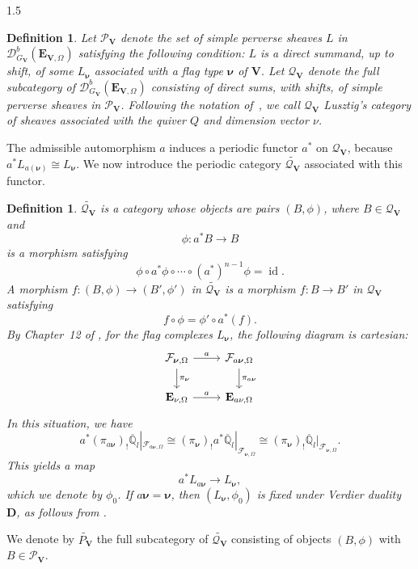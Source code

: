 \documentclass[10pt]{amsart}
\newtheorem{definition}[theorem]{Definition}
\def\bfV{{\mathbf V}}
\def\bfV{\mathbf{V}}
\newcommand\mP{{\mathcal{P}}}
\newcommand\mq{{\mathcal{Q}}}
\begin{document}
\begin{spacing}{1.5}
\begin{definition}
Let $\mathcal{P}_{\mathbf{V}}$ denote the set of simple perverse sheaves $L$ in $\mathcal{D}^{b}_{G_{\mathbf{V}}}(\mathbf{E}_{\mathbf{V},\Omega})$ satisfying the following condition: $L$ is a direct summand, up to shift, of some $L_{\boldsymbol{\nu}}$ associated with a flag type $\boldsymbol{\nu}$ of $\mathbf{V}$. Let $\mathcal{Q}_{\mathbf{V}}$ denote the full subcategory of $\mathcal{D}^{b}_{G_{\mathbf{V}}}(\mathbf{E}_{\mathbf{V},\Omega})$ consisting of direct sums, with shifts, of simple perverse sheaves in $\mathcal{P}_{\mathbf{V}}$. Following the notation of~\cite{OSNotes}, we call $\mathcal{Q}_{\mathbf{V}}$ Lusztig's category of sheaves associated with the quiver $Q$ and dimension vector $\nu$.
\end{definition}
The admissible automorphism $a$ induces a periodic functor $a^*$ on $\mq_{\bfV}$, because $a^*L_{a(\boldsymbol{\nu})}\cong L_{\boldsymbol{\nu}}$. We now introduce the periodic category $\widetilde{\mq_{\bfV}}$ associated with this functor.
\begin{definition}
   $\widetilde{\mq_{\bfV}}$ is a category whose objects are pairs $(B, \phi)$, where $B \in \mq_{\bfV}$ and 
\[
\phi : a^* B \rightarrow B
\]
is a morphism satisfying
\[
\phi \circ a^* \phi \circ \cdots \circ (a^*)^{n-1} \phi = \operatorname{id}.
\]
A morphism $f : (B, \phi) \to (B', \phi')$ in $\widetilde{\mq_{\bfV}}$ is a morphism $f : B \to B'$ in $\mq_{\bfV}$ satisfying
\[
f \circ \phi = \phi' \circ a^*(f).
\]
By Chapter~12 of \cite{lusztig2010introduction}, for the flag complexes $L_{\boldsymbol{\nu}}$, the following diagram is cartesian:
\[
\begin{tikzcd}
\mathcal{F}_{\boldsymbol{\nu},\Omega} \arrow[r, "a"] \arrow[d, "\pi_{\boldsymbol{\nu}}"] & \mathcal{F}_{a\boldsymbol{\nu},\Omega} \arrow[d, "\pi_{a\boldsymbol{\nu}}"] \\
\mathbf{E}_{\nu,\Omega} \arrow[r, "a"] & \mathbf{E}_{a\nu,\Omega}
\end{tikzcd}
\]
In this situation, we have
\[
a^*(\pi_{a\boldsymbol{\nu}})_{!}\overline{\mathbb{Q}}_{l}|_{\mathcal{F}_{a\boldsymbol{\nu},\Omega}}
\cong (\pi_{\boldsymbol{\nu}})_{!}a^*\overline{\mathbb{Q}}_{l}|_{\mathcal{F}_{\boldsymbol{\nu},\Omega}}
\cong (\pi_{\boldsymbol{\nu}})_{!}\overline{\mathbb{Q}}_{l}|_{\mathcal{F}_{\boldsymbol{\nu},\Omega}}.
\]
This yields a map
\[
a^* L_{a\boldsymbol{\nu}} \longrightarrow L_{\boldsymbol{\nu}},
\]
which we denote by $\phi_0$. If $a\boldsymbol{\nu}=\boldsymbol{\nu}$, then $(L_{\boldsymbol{\nu}},\phi_0)$ is fixed under Verdier duality $\mathbf{D}$, as follows from \cite[Lemma 12.3.2, Lemma 12.4.3]{lusztig2010introduction}.
\end{definition}
We denote by $\widetilde{P_{\bfV}}$ the full subcategory of $\widetilde{\mq_{\bfV}}$ consisting of objects $(B,\phi)$ with $B\in \mP_{\bfV}$.

\end{spacing}
\end{document}
